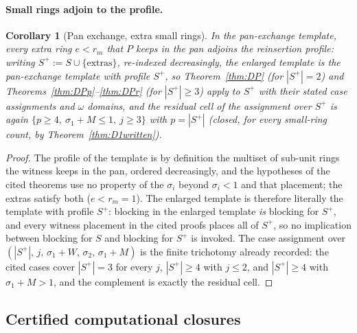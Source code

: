 \documentclass[11pt]{article}
\newtheorem{corollary}[theorem]{Corollary}
\theoremstyle{definition}
\begin{document}
\paragraph{Small rings adjoin to the profile.}

\begin{corollary}[Pan exchange, extra small rings]\label{cor:DSpan}
In the pan-exchange template, every extra ring $e<r_m$ that $P$ keeps
in the pan adjoins the reinsertion profile: writing
$S^{+}:=S\cup\{\text{extras}\}$, re-indexed decreasingly, the enlarged
template \emph{is} the pan-exchange template with profile $S^{+}$, so
Theorem~\ref{thm:DP} (for $|S^{+}|=2$) and
Theorems~\ref{thm:DPp}--\ref{thm:DPr} (for $|S^{+}|\ge3$) apply to
$S^{+}$ with their stated case assignments and $\omega$ domains, and
the residual cell of the assignment over $S^{+}$ is again
$\{p\ge4,\ \sigma_1+M\le1,\ j\ge3\}$ with $p=|S^{+}|$ (closed, for
every small-ring count, by Theorem~\ref{thm:D1written}).
\end{corollary}
\begin{proof}
The profile of the template is by definition the multiset of sub-unit
rings the witness keeps in the pan, ordered decreasingly, and the
hypotheses of the cited theorems use no property of the $\sigma_i$
beyond $\sigma_i<1$ and that placement; the extras satisfy both
($e<r_m=1$). The enlarged template is therefore literally the template
with profile $S^{+}$: blocking in the enlarged template \emph{is}
blocking for $S^{+}$, and every witness placement in the cited proofs
places all of $S^{+}$, so no implication between blocking for $S$ and
blocking for $S^{+}$ is invoked. The case assignment
over $(|S^{+}|,\,j,\,\sigma_1+W,\,\sigma_2,\,\sigma_1+M)$ is the
finite trichotomy already recorded: the cited cases cover
$|S^{+}|=3$ for every $j$, $|S^{+}|\ge4$ with $j\le2$, and
$|S^{+}|\ge4$ with $\sigma_1+M>1$, and the complement is exactly the
residual cell.
\end{proof}

\subsection*{Certified computational closures}
\end{document}
